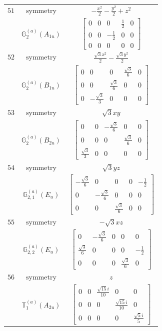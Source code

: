 \documentclass[fleqn,8pt,landscape]{jsarticle}
\begin{document}
\begin{longtable}{ccc}
$ 51 $ & $ \text{symmetry} $ & $ - \frac{x^{2}}{2} - \frac{y^{2}}{2} + z^{2} $ \\
$  $ & $ \mathbb{G}_{2}^{(a)}(A_{1u}) $ & $ \begin{bmatrix} 0 & 0 & 0 & \frac{1}{2} & 0 \\ 0 & 0 & - \frac{1}{2} & 0 & 0 \\ 0 & 0 & 0 & 0 & 0 \end{bmatrix} $ \\ \hline
$ 52 $ & $ \text{symmetry} $ & $ \frac{\sqrt{3} x^{2}}{2} - \frac{\sqrt{3} y^{2}}{2} $ \\
$  $ & $ \mathbb{G}_{2}^{(a)}(B_{1u}) $ & $ \begin{bmatrix} 0 & 0 & 0 & \frac{\sqrt{3}}{6} & 0 \\ 0 & 0 & \frac{\sqrt{3}}{6} & 0 & 0 \\ 0 & - \frac{\sqrt{3}}{3} & 0 & 0 & 0 \end{bmatrix} $ \\ \hline
$ 53 $ & $ \text{symmetry} $ & $ \sqrt{3} x y $ \\
$  $ & $ \mathbb{G}_{2}^{(a)}(B_{2u}) $ & $ \begin{bmatrix} 0 & 0 & - \frac{\sqrt{3}}{6} & 0 & 0 \\ 0 & 0 & 0 & \frac{\sqrt{3}}{6} & 0 \\ \frac{\sqrt{3}}{3} & 0 & 0 & 0 & 0 \end{bmatrix} $ \\ \hline
$ 54 $ & $ \text{symmetry} $ & $ \sqrt{3} y z $ \\
$  $ & $ \mathbb{G}_{2,1}^{(a)}(E_{u}) $ & $ \begin{bmatrix} - \frac{\sqrt{3}}{6} & 0 & 0 & 0 & - \frac{1}{2} \\ 0 & - \frac{\sqrt{3}}{6} & 0 & 0 & 0 \\ 0 & 0 & \frac{\sqrt{3}}{6} & 0 & 0 \end{bmatrix} $ \\ \hline
$ 55 $ & $ \text{symmetry} $ & $ - \sqrt{3} x z $ \\
$  $ & $ \mathbb{G}_{2,2}^{(a)}(E_{u}) $ & $ \begin{bmatrix} 0 & - \frac{\sqrt{3}}{6} & 0 & 0 & 0 \\ \frac{\sqrt{3}}{6} & 0 & 0 & 0 & - \frac{1}{2} \\ 0 & 0 & 0 & \frac{\sqrt{3}}{6} & 0 \end{bmatrix} $ \\ \hline
$ 56 $ & $ \text{symmetry} $ & $ z $ \\
$  $ & $ \mathbb{T}_{1}^{(a)}(A_{2u}) $ & $ \begin{bmatrix} 0 & 0 & \frac{\sqrt{15} i}{10} & 0 & 0 \\ 0 & 0 & 0 & \frac{\sqrt{15} i}{10} & 0 \\ 0 & 0 & 0 & 0 & \frac{\sqrt{5} i}{5} \end{bmatrix} $ \\ \hline

\end{longtable}
\end{document}

